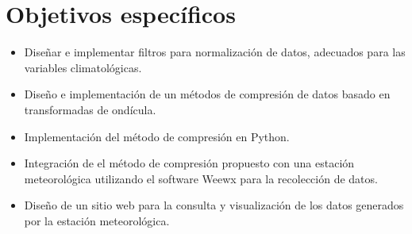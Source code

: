 \section{Objetivos específicos}

\begin{itemize}
   \item Diseñar e implementar filtros para normalización de datos, adecuados para las variables climatológicas.
   \item Diseño e implementación de un métodos de compresión de datos basado en transformadas de ondícula.
   \item Implementación del método de compresión en Python.
   \item Integración de el método de compresión propuesto con una estación meteorológica utilizando el software Weewx para la recolección de datos.
   \item Diseño de un sitio web para la consulta y visualización de los datos generados por la estación meteorológica.
\end{itemize}
